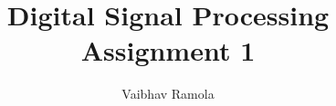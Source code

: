 \documentclass[journal,12pt,twocolumn]{IEEEtran}
\begin{document}
\let\StandardTheFigure\thefigure
\renewcommand{\thefigure}{\theproblem}



\def\putbox#1#2#3{\makebox[0in][l]{\makebox[#1][l]{}\raisebox{\baselineskip}[0in][0in]{\raisebox{#2}[0in][0in]{#3}}}}
\def\rightbox#1{\makebox[0in][r]{#1}}
\def\centbox#1{\makebox[0in]{#1}}
\def\topbox#1{\raisebox{-\baselineskip}[0in][0in]{#1}}
\def\midbox#1{\raisebox{-0.5\baselineskip}[0in][0in]{#1}}

\vspace{3cm}

\title{ 
		Digital Signal Processing \\
		Assignment 1
}

%
%
%

\author{ Vaibhav Ramola }
% 
%
\end{document}
